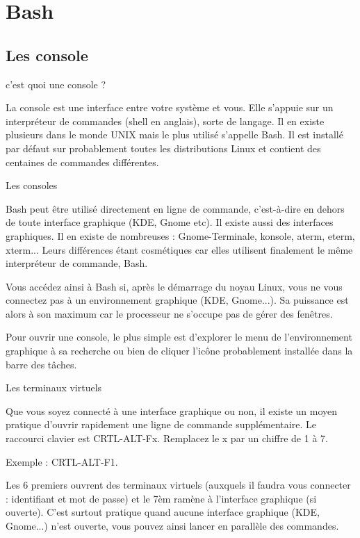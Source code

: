 \documentclass[10pt]{beamer}
\begin{document}
\section{Bash}
\subsection{Les console}
\begin{frame}[fragile]{c'est quoi une console ?}

La console est une interface entre votre système et vous. Elle s'appuie sur un
interpréteur de commandes (shell en anglais), sorte de langage. Il en existe
plusieurs dans le monde UNIX mais le plus utilisé s'appelle Bash. Il est installé par
défaut sur probablement toutes les distributions Linux et contient des centaines de
commandes différentes.

\end{frame}


\begin{frame}[fragile]{Les consoles}

Bash peut être utilisé directement en ligne de commande, c'est-à-dire en dehors de
toute interface graphique (KDE, Gnome etc). Il existe aussi des interfaces graphiques. Il en existe de nombreuses : Gnome-Terminale, konsole, aterm, eterm, xterm... Leurs différences étant cosmétiques car elles utilisent finalement le même interpréteur de commande, Bash.

Vous accédez ainsi à Bash si, après le démarrage du noyau Linux, vous ne vous connectez pas à un environnement graphique (KDE, Gnome...). Sa puissance est alors à son maximum car le processeur ne s'occupe pas de gérer des fenêtres. 

Pour ouvrir une console, le plus simple est d'explorer le menu de l'environnement graphique à sa recherche ou bien de cliquer l'icône probablement installée dans la barre des tâches.
\end{frame}


\begin{frame}{Les terminaux virtuels}

Que vous soyez connecté à une interface graphique ou non, il existe un moyen
pratique d'ouvrir rapidement une ligne de commande supplémentaire. Le raccourci
clavier est CRTL-ALT-Fx. Remplacez le x par un chiffre de 1 à 7.

Exemple : \alert{CRTL-ALT-F1}. 

Les 6 premiers ouvrent des terminaux virtuels (auxquels il faudra vous connecter : identifiant et mot de passe) et le 7èm ramène à l'interface graphique (si ouverte). C'est surtout pratique quand aucune interface graphique (KDE, Gnome...) n'est ouverte, vous pouvez ainsi lancer en parallèle des commandes.
\end{frame}
\end{document}
